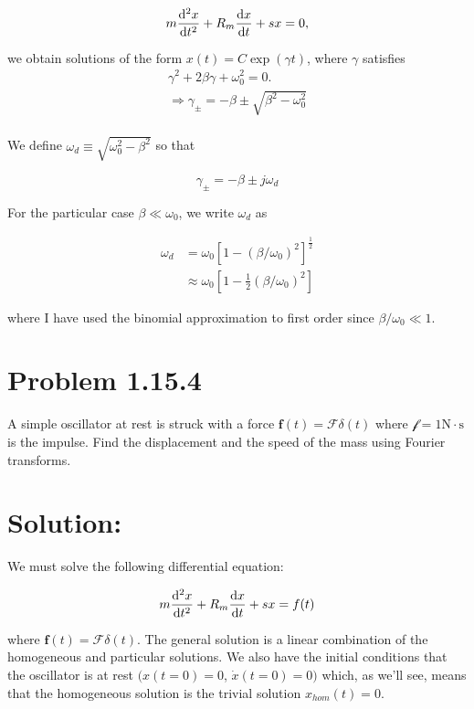 \documentclass{article}
\begin{document}
\[
  m \dv[2]{x}{t} + R_m \dv{x}{t} + s x = 0,
\]

we obtain solutions of the form $ x(t) = C \exp(\gamma t) $, where $\gamma$ satisfies
\begin{gather*}
  \gamma^2 + 2 \beta \gamma + \omega_{0}^2 = 0.
  \\
  \Rightarrow \gamma_{\pm} = -\beta \pm \sqrt{ \beta^2 - \omega_{0}^2 }
  \\
\end{gather*}

We define $ \omega_d \equiv \sqrt{ \omega_{0}^2 - \beta^2 }$ so that

\[
   \gamma_{\pm} = - \beta \pm j \omega_d
\]


For the particular case $ \beta \ll \omega_{0} $, we write $ \omega_d $ as

\[
  \begin{split}
    \omega_d &= \omega_{0}[ 1 - ( \beta / \omega_{0})^2 ] ^ \frac{1}{2}
    \\
             &\approx \omega_{0}[ 1 - \frac{1}{2} ( \beta / \omega_{0} )^2 ]
  \end{split}
\]

where I have used the binomial approximation to first order since $ \beta / \omega_{0} \ll 1 $.

\newpage
%
%

\section*{Problem 1.15.4}

A simple oscillator at rest is struck with a force $ \textbf{f}(t) = \mathscr{F} \delta(t) $ where $ \mathscr{f} = 1 \text{N} \cdot \text{s} $ is the impulse. Find the displacement and the speed of the
mass using Fourier transforms.

\section*{Solution:}

We must solve the following differential equation:

\[
m \dv[2]{x}{t} + R_m \dv{x}{t} + s x = f(t)
\]

where $\mathbf{f}(t) = \mathscr{F} \delta (t)$. The general solution is a linear combination of the homogeneous and
particular solutions. We also have the initial conditions that the oscillator is at rest $(x(t=0) = 0$, $\dot{x}(t=0) = 0)$
which, as we'll see, means that the homogeneous solution is the trivial solution $x_{hom}(t) = 0$.
\end{document}
